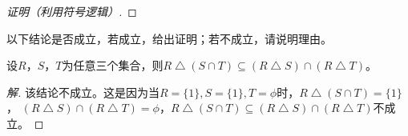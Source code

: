 \documentclass{article}
\begin{document}
\begin{CJK}{UTF8}{gbsn}
\begin{proof}[证明（利用符号逻辑）]
\end{proof}

  \begin{Ex}
    以下结论是否成立，若成立，给出证明；若不成立，请说明理由。
    
      设$R$，$S$，$T$为任意三个集合，则$R\bigtriangleup (S\cap T) \subseteq (R\bigtriangleup S)\cap (R\bigtriangleup T)$。
\end{Ex}
\begin{proof}[解]
  该结论不成立。这是因为当$R=\{1\}, S=\{1\}, T = \phi$时，$R\bigtriangleup (S\cap T)=\{1\}$， $(R\bigtriangleup S)\cap (R\bigtriangleup T)=\phi$，$R\bigtriangleup (S\cap T)\subseteq (R\bigtriangleup S)\cap (R\bigtriangleup T)$不成立。
\end{proof}

\end{CJK}
\end{document}
